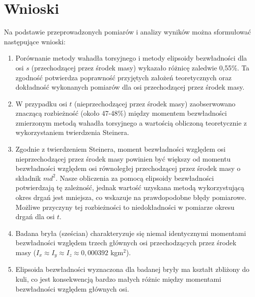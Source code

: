 \documentclass[a4paper,12pt]{article}
\begin{document}
\section{Wnioski}


Na podstawie przeprowadzonych pomiarów i analizy wyników można sformułować następujące wnioski:

\begin{enumerate}
    \item Porównanie metody wahadła torsyjnego i metody elipsoidy bezwładności dla osi $s$ (przechodzącej przez środek masy) wykazało różnicę zaledwie 0,55\%. Ta zgodność potwierdza poprawność przyjętych założeń teoretycznych oraz dokładność wykonanych pomiarów dla osi przechodzącej przez środek masy.

    \item W przypadku osi $t$ (nieprzechodzącej przez środek masy) zaobserwowano znaczącą rozbieżność (około 47-48\%) między momentem bezwładności zmierzonym metodą wahadła torsyjnego a wartością obliczoną teoretycznie z wykorzystaniem twierdzenia Steinera.

    \item Zgodnie z twierdzeniem Steinera, moment bezwładności względem osi nieprzechodzącej przez środek masy powinien być większy od momentu bezwładności względem osi równoległej przechodzącej przez środek masy o składnik $md^2$. Nasze obliczenia za pomocą elipsoidy bezwładności potwierdzają tę zależność, jednak wartość uzyskana metodą wykorzystującą okres drgań jest mniejsza, co wskazuje na prawdopodobne błędy pomiarowe. Możliwe przyczyny tej rozbieżności to niedokładności w pomiarze okresu drgań dla osi $t$.

    \item Badana bryła (sześcian) charakteryzuje się niemal identycznymi momentami bezwładności względem trzech głównych osi przechodzących przez środek masy ($I_x \approx I_y \approx I_z \approx 0,000392$ kgm$^2$).

    \item Elipsoida bezwładności wyznaczona dla badanej bryły ma kształt zbliżony do kuli, co jest konsekwencją bardzo małych różnic między momentami bezwładności względem głównych osi.

\end{enumerate}




\end{document}
